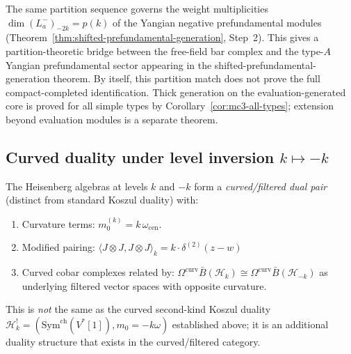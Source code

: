\begin{remark}
The same partition sequence governs the weight multiplicities
\(\dim(L^-_a)_{-2k} = p(k)\) of the Yangian negative
prefundamental modules
\textup{(}Theorem~\textup{\ref{thm:shifted-prefundamental-generation}},
Step~2\textup{)}. This gives a partition-theoretic bridge between the
free-field bar complex and the type-$A$ Yangian prefundamental sector
appearing in the shifted-prefundamental-generation theorem. By
itself, this partition match does not prove the full compact-completed
identification. Thick generation on the evaluation-generated core is
proved for all simple types by Corollary~\ref{cor:mc3-all-types};
extension beyond evaluation modules is a separate theorem.
\end{remark}

\subsection{\texorpdfstring{Curved duality under level inversion $k \mapsto -k$}{Curved duality under level inversion k -k}}

\begin{theorem}\label{thm:heisenberg-level-inversion}
The Heisenberg algebras at levels $k$ and $-k$ form a \emph{curved/filtered dual pair} (distinct from standard Koszul duality) with:
\begin{enumerate}
\item Curvature terms:
$m_0^{(k)}=k\,\omega_{\mathrm{cen}}$.
\item Modified pairing: $\langle J \otimes J, J \otimes J \rangle_k = k \cdot \delta^{(2)}(z-w)$
\item Curved cobar complexes related by:
$\Omega^{\mathrm{curv}}\bar{B}(\mathcal{H}_k)\cong
\Omega^{\mathrm{curv}}\bar{B}(\mathcal{H}_{-k})$ as underlying
filtered vector spaces with opposite curvature.
\end{enumerate}

This is \emph{not} the same as the curved second-kind Koszul duality
$\mathcal{H}_k^! =
(\mathrm{Sym}^{\mathrm{ch}}(V^*[1]),m_0=-k\omega)$ established above;
it is an additional duality structure that exists in the
curved/filtered category.
\end{theorem}

